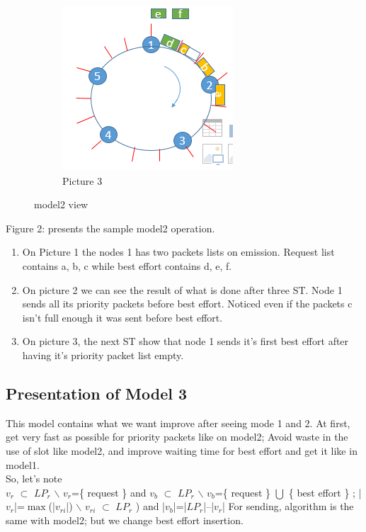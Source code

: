 \documentclass{article}
\begin{document}
\begin{figure}
\begin{subfigure}[b]{0.3\textwidth}
    \includegraphics[width=\textwidth]{model23.PNG}
    \caption{Picture 3}
    \label{fig:3}
  \end{subfigure}
\caption{ model2 view}
\end{figure}

Figure 2: presents the sample model2 operation.
\begin{enumerate}[label=$\bullet$]
\item On Picture 1 the nodes 1 has two packets lists on emission. Request list contains a, b, c while best effort contains d, e, f.    
\item On picture 2 we can see the result of what is done after three ST. Node 1 sends all its priority packets before best effort. Noticed even if the packets c isn't full enough it was sent before best effort.
\item On picture 3, the next ST show that node 1 sends it's first best effort after having it's priority packet list empty.
\end{enumerate}


\subsection{Presentation of Model 3}
This model contains what we want improve after seeing mode 1 and 2. At first, get very fast as possible for priority packets like on model2; Avoid waste in the use of slot like model2, and improve waiting time for best effort and get it like in model1.\\
So, let's note\\
 $v_{r}$ $\subset$ $LP_{r}$ $\backslash$ $v_{r}$=\{ request \} and $v_{b}$ $\subset$ $LP_{r}$ $\backslash$ $v_{b}$=\{ request \} $\bigcup $ \{ best effort \} ; 
|$v_{r}$|=$\max$(|$v_{ri}$|) $\backslash$ $v_{ri}$  $\subset$ $LP_{r}$ ) and |$v_{b}$|=|$LP_{r}$|--|$v_{r}$|
For sending, algorithm is the same with model2; but we change best effort  insertion.
\end{document}
